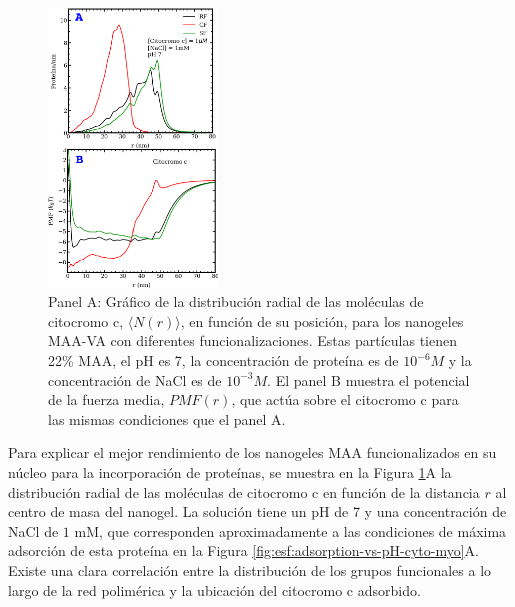 
\begin{figure}[!htb]
     \centering
     \includegraphics[width=0.40\textwidth]{Figures/graphs-gel2/cito-adsr-pmf.pdf}
     \caption{Panel A: Gr\'afico de la distribuci\'on radial de las mol\'eculas de citocromo c, $\langle N(r)\rangle$, en funci\'on de su posici\'on, para los nanogeles MAA-VA con diferentes funcionalizaciones.
     	Estas part\'iculas tienen 22\% MAA, el pH es 7, la concentraci\'on de prote\'ina es de $10^{-6}M$ y la concentraci\'on de NaCl es de $10^{-3}M$.
     	El panel B muestra el potencial de la fuerza media, ${PMF}(r)$, que act\'ua sobre el citocromo c para las mismas condiciones que el panel A.}
     \label{fig:esf:adsorption-vs-r-cyto}
 \end{figure}



Para explicar el mejor rendimiento de los nanogeles MAA funcionalizados en su n\'ucleo para la incorporaci\'on de prote\'inas, se muestra en la Figura \ref{fig:esf:adsorption-vs-r-cyto}A la distribuci\'on radial de las mol\'eculas de citocromo c en funci\'on de la distancia $r$ al centro de masa del nanogel. La soluci\'on tiene un pH de 7 y una concentraci\'on de NaCl de $1 $ mM, que corresponden aproximadamente a las condiciones de m\'axima adsorci\'on de esta prote\'ina en la Figura \ref{fig:esf:adsorption-vs-pH-cyto-myo}A. Existe una clara correlaci\'on entre la distribuci\'on de los grupos funcionales a lo largo de la red polim\'erica y la ubicaci\'on del citocromo c adsorbido.

